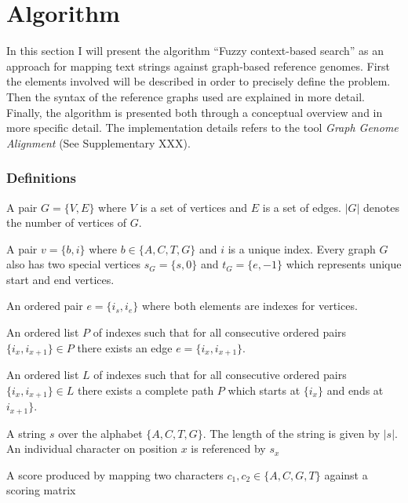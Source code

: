 \documentclass{article}
\begin{document}
\chapter{Algorithm}
In this section I will present the algorithm ``Fuzzy context-based search'' as an approach for mapping text strings against graph-based reference genomes. First the elements involved will be described in order to precisely define the problem. Then the syntax of the reference graphs used are explained in more detail. Finally, the algorithm is presented both through a conceptual overview and in more specific detail. The implementation details refers to the tool \textit{Graph Genome Alignment} (See Supplementary XXX).
\subsection{Definitions}
\begin{defn}
  A pair $G=\{V,E\}$ where $V$ is a set of vertices and $E$ is a set of edges. $|G|$ denotes the number of vertices of $G$.
\end{defn}
\begin{defn}[Vertice]
  A pair $v=\{b, i\}$ where $b \in \{A, C, T, G\}$ and $i$ is a unique index. Every graph $G$ also has two special vertices $s_G=\{s, 0\}$ and $t_G=\{e, -1\}$ which represents unique start and end vertices.
\end{defn}
\begin{defn}[Edge]
  An ordered pair $e=\{i_s, i_e\}$ where both elements are indexes for vertices. 
\end{defn}
\begin{defn}
  An ordered list $P$ of indexes such that for all consecutive ordered pairs $\{i_x, i_{x+1}\} \in P$ there exists an edge $e=\{i_x, i_{x+1}\}$.
\end{defn}
\begin{defn}[Path]
  An ordered list $L$ of indexes such that for all consecutive ordered pairs $\{i_x, i_{x+1}\} \in L$ there exists a complete path $P$ which starts at $\{i_x\}$ and ends at $i_{x+1}\}$.
\end{defn}
\begin{defn}
  A string $s$ over the alphabet $\{A, C, T, G\}$. The length of the string is given by $|s|$. An individual character on position $x$ is referenced by $s_x$
\end{defn}
\begin{defn}
  A score produced by mapping two characters $c_1, c_2 \in \{A, C, G, T\}$ against a scoring matrix
\end{defn}
\end{document}
